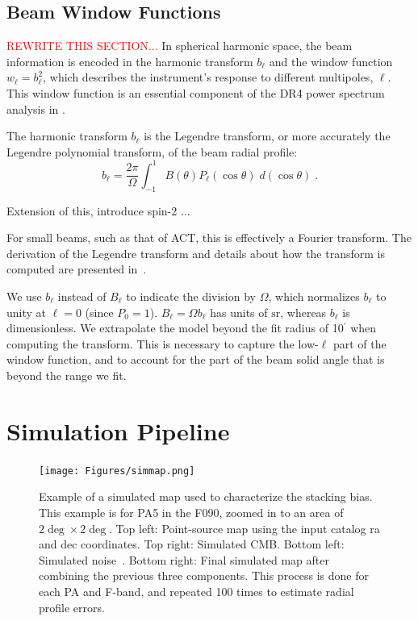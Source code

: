 \subsection{Beam Window Functions}
\label{subsec:window}
\textcolor{red}{REWRITE THIS SECTION...}
In spherical harmonic space, the beam information is encoded in the harmonic transform $b_{\ell}$ and the window function $w_{\ell} = b_{\ell}^2$, which describes the instrument's response to different multipoles, $\ell$. This window function is an essential component of the DR4 power spectrum analysis in \cite{choi_2020}.

The harmonic transform $b_{\ell}$ is the Legendre transform, or more accurately the Legendre polynomial transform, of the beam radial profile:
\begin{equation}
b_{\ell} = \frac{2\pi}{\Omega}\int_{-1}^{1} B(\theta)P_{\ell}(\cos\theta)\; d(\cos\theta) \; .
\label{eq:legendre}
\end{equation}

Extension of this, introduce spin-2 ...

For small beams, such as that of ACT, this is effectively a Fourier transform. The derivation of the Legendre transform and details about how the transform is computed are presented in~\cite{Lungu_2022}.

We use $b_{\ell}$ instead of $B_{\ell}$ to indicate the division by $\Omega$, which normalizes $b_{\ell}$ to unity at $\ell = 0$ (since $P_0 = 1$). $B_{\ell} = \Omega b_{\ell}$ has units of $\mathrm{sr}$, whereas $b_{\ell}$ is dimensionless. We extrapolate the model beyond the fit radius of 10$^{\prime}$ when computing the transform.
This is necessary to capture the low-$\ell$ part of the window function, and to account for the part of the beam solid angle that is beyond the range we fit.

\section{Simulation Pipeline}
\label{sec:sim_pipe}

\begin{figure}[t!]
    \centering
    \texttt{[image: Figures/simmap.png]}
    \caption{Example of a simulated map used to characterize the stacking bias.  This example is for PA5 in the F090, zoomed in to an area of $2\deg\times2\deg$.  Top left: Point-source map using the input catalog ra and dec coordinates.  Top right:  Simulated CMB.  Bottom left:  Simulated noise~\cite{atkins}.  Bottom right: Final simulated map after combining the previous three components.  This process is done for each PA and F-band, and repeated 100 times to estimate radial profile errors.
    }
    \label{fig:sim_map}
\end{figure}

